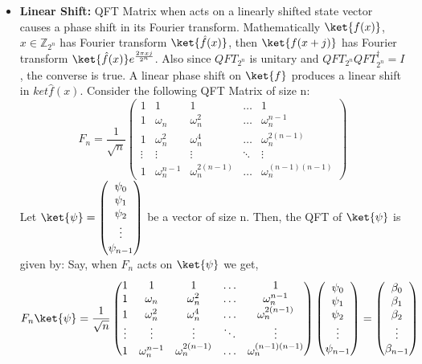 \documentclass[12pt, oneside]{book}
\theoremstyle{definition}
\theoremstyle{definition}
\theoremstyle{remark}
\begin{document}
\begin{itemize}
\begin{proof}
        \textbf{because, the Foruier transform is a unitary opeator, we can implement it in a quantum circuit. Thus is $N=2^n$, we can
        apply the Fourier transform $QFT_N=QFT_{2^n}$ to a n-qubit system.}
    \end{proof}
    \item \textbf{Linear Shift: } 
    QFT Matrix when acts on a linearly shifted state vector causes a phase shift in its Fourier transform.
    Mathematically $\ket{f(x)}$, $x \in \mathbb{Z}_{2^n}$ has Fourier transform $\ket{\hat{f}(x)}$, then $\ket{f(x+j)}$ has Fourier transform
    $\ket{\hat{f}(x)}e^{\frac{2\pi xj}{2^n}}$. Also since $QFT_{2^n}$ is unitary and $QFT_{2^n}QFT^{\dagger}_{2^n}=I$, the converse is true. A linear phase shift on $\ket{f}$ produces a linear shift in $
    ket{\hat{f}(x)}$.
    Consider the following QFT Matrix of size n:
        \[ F_n=\dfrac{1}{\sqrt{n}}\begin{pmatrix} 1 & 1 & 1 & \ldots & 1 \\ 1 & \omega_n & \omega_n^2 & \ldots & \omega_n^{n-1} \\ 1 & \omega_n^2 & \omega_n^4 & \ldots & \omega_n^{2(n-1)} \\ \vdots & \vdots & \vdots & \ddots & \vdots \\ 1 & \omega_n^{n-1} & \omega_n^{2(n-1)} & \ldots & \omega_n^{(n-1)(n-1)} \end{pmatrix} \]
        Let $\ket{\psi}=\begin{pmatrix} \psi_0 \\ \psi_1 \\ \psi_2 \\ \vdots \\ \psi_{n-1} \end{pmatrix}$ be a vector of size n. Then, the QFT of $\ket{\psi}$ is given by:
        Say, when $F_n$ acts on $\ket{\psi}$ we get,
        \[ F_n\ket{\psi}=\dfrac{1}{\sqrt{n}}\begin{pmatrix} 1 & 1 & 1 & \ldots & 1 \\ 1 & \omega_n & \omega_n^2 & \ldots & \omega_n^{n-1} \\ 1 & \omega_n^2 & \omega_n^4 & \ldots & \omega_n^{2(n-1)} \\ \vdots & \vdots & \vdots & \ddots & \vdots \\ 1 & \omega_n^{n-1} & \omega_n^{2(n-1)} & \ldots & \omega_n^{(n-1)(n-1)} \end{pmatrix}\begin{pmatrix} \psi_0 \\ \psi_1 \\ \psi_2 \\ \vdots \\ \psi_{n-1} \end{pmatrix}=\begin{pmatrix} \beta_0 \\ \beta_1 \\ \beta_2 \\ \vdots \\ \beta_{n-1} \end{pmatrix} \]

\end{itemize}
\end{document}
